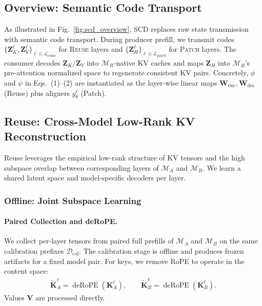 \documentclass{article}
\theoremstyle{plain}
\theoremstyle{definition}
\theoremstyle{remark}
\begin{document}
\subsection{Overview: Semantic Code Transport}
\label{subsec:overview}

As illustrated in Fig.~\ref{fig:scd_overview}, SCD replaces raw state transmission with semantic code transport.
During producer prefill, we transmit codes $\{\mathbf{Z}_K^\ell, \mathbf{Z}_V^\ell\}_{\ell \in \mathcal{L}_{\mathrm{reuse}}}$ for \textsc{Reuse} layers and $\{\mathbf{Z}_H^\ell\}_{\ell \in \mathcal{L}_{\mathrm{patch}}}$ for \textsc{Patch} layers.
The consumer decodes $\mathbf{Z}_K / \mathbf{Z}_V$ into $\mathcal{M}_B$-native KV caches and maps $\mathbf{Z}_H$ into $\mathcal{M}_B$'s pre-attention normalized space to regenerate consistent KV pairs.
Concretely, $\phi$ and $\psi$ in Eqs.~(1)--(2) are instantiated as the layer-wise linear maps $\mathbf{W}_{\mathrm{enc}}, \mathbf{W}_{\mathrm{dec}}$ (Reuse) plus aligners $g_\theta^\ell$ (Patch).

\subsection{Reuse: Cross-Model Low-Rank KV Reconstruction}
\label{subsec:reuse}

Reuse leverages the empirical low-rank structure of KV tensors and the high subspace overlap between corresponding layers of $\mathcal{M}_A$ and $\mathcal{M}_B$.
We learn a shared latent space and model-specific decoders per layer.

\subsubsection{Offline: Joint Subspace Learning}
\label{subsec:reuse_offline}

\paragraph{Paired Collection and deRoPE.}
We collect per-layer tensors from paired full prefills of $\mathcal{M}_A$ and $\mathcal{M}_B$ on the same calibration prefixes $\mathcal{D}_{\mathrm{cal}}$.
The calibration stage is offline and produces frozen artifacts for a fixed model pair.
For keys, we remove RoPE to operate in the content space:
\begin{align}
\tilde{\mathbf{K}}_A^\ell = \operatorname{deRoPE}(\mathbf{K}_A^\ell), \qquad
\tilde{\mathbf{K}}_B^\ell = \operatorname{deRoPE}(\mathbf{K}_B^\ell).
\end{align}
Values $\mathbf{V}$ are processed directly.
\end{document}
